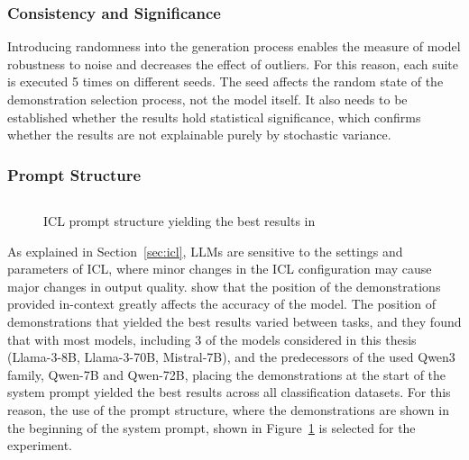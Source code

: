 \documentclass[english, 12pt, a4paper, sci, utf8, a-2b, online]{latex/definitions/aaltothesis}
\begin{document}
\subsubsection*{Consistency and Significance}

Introducing randomness into the generation process enables the measure of model robustness to noise and decreases the effect of outliers. For this reason, each suite is executed 5 times on different seeds. The seed affects the random state of the demonstration selection process, not the model itself. It also needs to be established whether the results hold statistical significance, which confirms whether the results are not explainable purely by stochastic variance.

\subsubsection{Prompt Structure}

\begin{figure}
    \centering
    \begin{subfigure}{0.6\textwidth}
        \inputminted[fontsize=\small]{text}{./minted_inputs/ssp_prompt_structure.txt}
    \end{subfigure}
    \caption{ICL prompt structure yielding the best results in \cite{cobbina2025demospromptpositionalbias}}
    \label{fig:prompt_structure}
\end{figure}

As explained in Section~\ref{sec:icl}, LLMs are sensitive to the settings and parameters of ICL, where minor changes in the ICL configuration may cause major changes in output quality. \textcite{cobbina2025demospromptpositionalbias} show that the position of the demonstrations provided in-context greatly affects the accuracy of the model. The position of demonstrations that yielded the best results varied between tasks, and they found that with most models, including 3 of the models considered in this thesis (Llama-3-8B, Llama-3-70B, Mistral-7B), and the predecessors of the used Qwen3 family, Qwen-7B and Qwen-72B, placing the demonstrations at the start of the system prompt yielded the best results across all classification datasets. For this reason, the use of the prompt structure, where the demonstrations are shown in the beginning of the system prompt, shown in Figure~\ref{fig:prompt_structure} is selected for the experiment.
\end{document}
